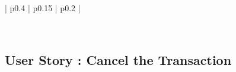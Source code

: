 \documentclass[12pt]{report}
\begin{document}
\begin{longtable}{!{\color{blue}\vrule width 5pt} p{0.4\linewidth} | p{0.15\linewidth} | p{0.2\linewidth} !{\color{blue}\vrule width 5pt} }
	
	 \\ %
	
	\hline
	
	
	\noalign{\global\arrayrulewidth=1mm}
	\hline
	\noalign{\global\arrayrulewidth=0.5mm}
	\hline	
	
\end{longtable}





\vspace{1cm}
\subsection{User Story : Cancel the Transaction}
\end{document}
